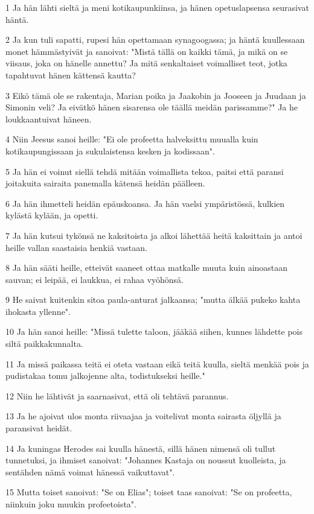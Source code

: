 \par 1 Ja hän lähti sieltä ja meni kotikaupunkiinsa, ja hänen opetuslapsensa seurasivat häntä.
\par 2 Ja kun tuli sapatti, rupesi hän opettamaan synagoogassa; ja häntä kuullessaan monet hämmästyivät ja sanoivat: "Mistä tällä on kaikki tämä, ja mikä on se viisaus, joka on hänelle annettu? Ja mitä senkaltaiset voimalliset teot, jotka tapahtuvat hänen kättensä kautta?
\par 3 Eikö tämä ole se rakentaja, Marian poika ja Jaakobin ja Jooseen ja Juudaan ja Simonin veli? Ja eivätkö hänen sisarensa ole täällä meidän parissamme?" Ja he loukkaantuivat häneen.
\par 4 Niin Jeesus sanoi heille: "Ei ole profeetta halveksittu muualla kuin kotikaupungissaan ja sukulaistensa kesken ja kodissaan".
\par 5 Ja hän ei voinut siellä tehdä mitään voimallista tekoa, paitsi että paransi joitakuita sairaita panemalla kätensä heidän päälleen.
\par 6 Ja hän ihmetteli heidän epäuskoansa. Ja hän vaelsi ympäristössä, kulkien kylästä kylään, ja opetti.
\par 7 Ja hän kutsui tykönsä ne kaksitoista ja alkoi lähettää heitä kaksittain ja antoi heille vallan saastaisia henkiä vastaan.
\par 8 Ja hän sääti heille, etteivät saaneet ottaa matkalle muuta kuin ainoastaan sauvan; ei leipää, ei laukkua, ei rahaa vyöhönsä.
\par 9 He saivat kuitenkin sitoa paula-anturat jalkaansa; "mutta älkää pukeko kahta ihokasta yllenne".
\par 10 Ja hän sanoi heille: "Missä tulette taloon, jääkää siihen, kunnes lähdette pois siltä paikkakunnalta.
\par 11 Ja missä paikassa teitä ei oteta vastaan eikä teitä kuulla, sieltä menkää pois ja pudistakaa tomu jalkojenne alta, todistukseksi heille."
\par 12 Niin he lähtivät ja saarnasivat, että oli tehtävä parannus.
\par 13 Ja he ajoivat ulos monta riivaajaa ja voitelivat monta sairasta öljyllä ja paransivat heidät.
\par 14 Ja kuningas Herodes sai kuulla hänestä, sillä hänen nimensä oli tullut tunnetuksi, ja ihmiset sanoivat: "Johannes Kastaja on noussut kuolleista, ja sentähden nämä voimat hänessä vaikuttavat".
\par 15 Mutta toiset sanoivat: "Se on Elias"; toiset taas sanoivat: "Se on profeetta, niinkuin joku muukin profeetoista".
